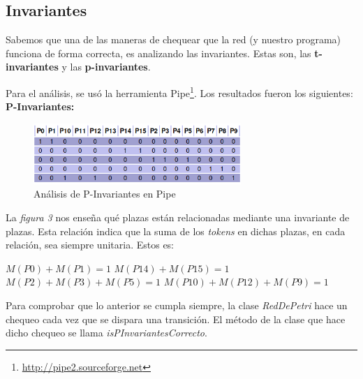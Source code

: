 \documentclass{article}
\newcommand{\fnpipe}{\url{http://pipe2.sourceforge.net}}
\begin{document}
    \subsection{Invariantes}
    Sabemos que una de las maneras de chequear que la red (y nuestro programa) funciona 
    de forma correcta, es analizando las invariantes. Estas son, las \textbf{t-invariantes}
    y las \textbf{p-invariantes}. \par
    Para el análisis, se usó la herramienta Pipe\footnote{\fnpipe}.
    Los resultados fueron los siguientes: \newline \newline
    \textbf{P-Invariantes:} \\
    \begin{figure}[h]
        \includegraphics[width=0.7\textwidth, center]{p-invariante.png}
        \caption{Análisis de P-Invariantes en Pipe}
    \end{figure}
    La \emph{figura 3} nos enseña qué plazas están relacionadas mediante una invariante de
    plazas. Esta relación indica que la suma de los \emph{tokens} en dichas plazas, en cada
    relación, sea siempre unitaria. Estos es: \newline \newline
    \begin{center}
        $M(P0) + M(P1) = 1$ \newline \newline
        $M(P14) + M(P15) = 1$ \newline \newline
        $M(P2) + M(P3) + M(P5) = 1$ \newline \newline
        $M(P10) + M(P12) + M(P9) = 1$ \newline \newline
    \end{center} \par
    Para comprobar que lo anterior se cumpla siempre, la clase \emph{RedDePetri} hace un 
    chequeo cada vez que se dispara una transición. El método de la clase que hace dicho
    chequeo se llama \emph{isPInvariantesCorrecto}. \newline \newline
\end{document}
